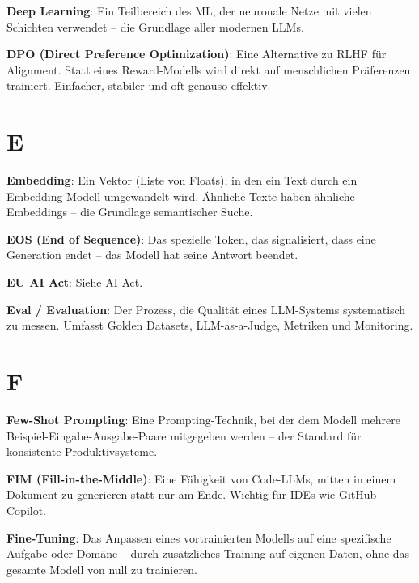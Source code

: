 \textbf{Deep Learning}\hspace{0pt}: Ein Teilbereich des ML, der neuronale Netze mit vielen Schichten verwendet -- die Grundlage aller modernen LLMs.

\textbf{DPO (Direct Preference Optimization)}\hspace{0pt}: Eine Alternative zu RLHF für Alignment. Statt eines Reward-Modells wird direkt auf menschlichen Präferenzen trainiert. Einfacher, stabiler und oft genauso effektiv.

\section{E}

\textbf{Embedding}\hspace{0pt}: Ein Vektor (Liste von Floats), in den ein Text durch ein Embedding-Modell umgewandelt wird. Ähnliche Texte haben ähnliche Embeddings -- die Grundlage semantischer Suche.

\textbf{EOS (End of Sequence)}\hspace{0pt}: Das spezielle Token, das signalisiert, dass eine Generation endet -- das Modell hat seine Antwort beendet.

\textbf{EU AI Act}\hspace{0pt}: Siehe AI Act.

\textbf{Eval / Evaluation}\hspace{0pt}: Der Prozess, die Qualität eines LLM-Systems systematisch zu messen. Umfasst Golden Datasets, LLM-as-a-Judge, Metriken und Monitoring.

\section{F}

\textbf{Few-Shot Prompting}\hspace{0pt}: Eine Prompting-Technik, bei der dem Modell mehrere Beispiel-Eingabe-Ausgabe-Paare mitgegeben werden -- der Standard für konsistente Produktivsysteme.

\textbf{FIM (Fill-in-the-Middle)}\hspace{0pt}: Eine Fähigkeit von Code-LLMs, mitten in einem Dokument zu generieren statt nur am Ende. Wichtig für IDEs wie GitHub Copilot.

\textbf{Fine-Tuning}\hspace{0pt}: Das Anpassen eines vortrainierten Modells auf eine spezifische Aufgabe oder Domäne -- durch zusätzliches Training auf eigenen Daten, ohne das gesamte Modell von null zu trainieren.


